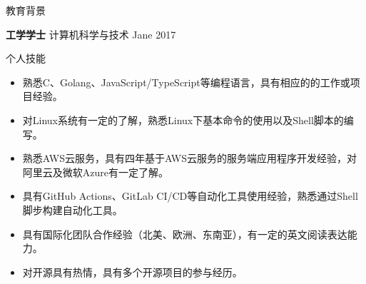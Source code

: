 \documentclass{resume} %
\begin{document}

\begin{rSection}{教育背景}

  {\bf 工学学士} 计算机科学与技术 \hfill {Jane 2017}

\end{rSection}

\begin{rSection}{个人技能}
  \begin{itemize}
    \itemsep -3pt {}
    \item 熟悉C、Golang、JavaScript/TypeScript等编程语言，具有相应的的工作或项目经验。
    \item 对Linux系统有一定的了解，熟悉Linux下基本命令的使用以及Shell脚本的编写。
    \item 熟悉AWS云服务，具有四年基于AWS云服务的服务端应用程序开发经验，对阿里云及微软Azure有一定了解。
    \item 具有GitHub Actions、GitLab CI/CD等自动化工具使用经验，熟悉通过Shell脚步构建自动化工具。
    \item 具有国际化团队合作经验（北美、欧洲、东南亚），有一定的英文阅读表达能力。
    \item 对开源具有热情，具有多个开源项目的参与经历。
  \end{itemize}
\end{rSection}
\end{document}
